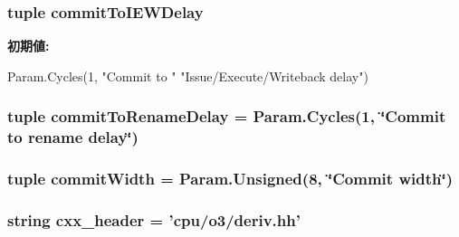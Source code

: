 \label{classO3CPU_1_1DerivO3CPU_aad1963f659c6e9595b5d1ff499e843d8}
\hypertarget{classO3CPU_1_1DerivO3CPU_afc77f4f67ebd047a4af56403975f4464}{
\subsubsection[{commitToIEWDelay}]{\setlength{\rightskip}{0pt plus 5cm}tuple {\bf commitToIEWDelay}}}
\label{classO3CPU_1_1DerivO3CPU_afc77f4f67ebd047a4af56403975f4464}
{\bfseries 初期値:}
\begin{DoxyCode}
Param.Cycles(1, "Commit to "
               "Issue/Execute/Writeback delay")
\end{DoxyCode}
\hypertarget{classO3CPU_1_1DerivO3CPU_a35c9cdaf793827c316dee784cbf39d96}{
\subsubsection[{commitToRenameDelay}]{\setlength{\rightskip}{0pt plus 5cm}tuple {\bf commitToRenameDelay} = Param.Cycles(1, \char`\"{}Commit to rename delay\char`\"{})}}
\label{classO3CPU_1_1DerivO3CPU_a35c9cdaf793827c316dee784cbf39d96}
\hypertarget{classO3CPU_1_1DerivO3CPU_a3df421018d58bcd7f02c3965f6b43ac3}{
\subsubsection[{commitWidth}]{\setlength{\rightskip}{0pt plus 5cm}tuple {\bf commitWidth} = Param.Unsigned(8, \char`\"{}Commit width\char`\"{})}}
\label{classO3CPU_1_1DerivO3CPU_a3df421018d58bcd7f02c3965f6b43ac3}
\hypertarget{classO3CPU_1_1DerivO3CPU_a17da7064bc5c518791f0c891eff05fda}{
\subsubsection[{cxx\_\-header}]{\setlength{\rightskip}{0pt plus 5cm}string {\bf cxx\_\-header} = 'cpu/o3/deriv.hh'}}
\label{classO3CPU_1_1DerivO3CPU_a17da7064bc5c518791f0c891eff05fda}


